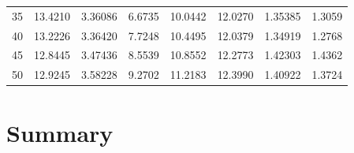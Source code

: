 \documentclass[a4paper,twoside,12pt]{book}
\newcounter{PagesWithoutNumbers}
\begin{document}
\begin{table}
\begin{tabular}{rrrrrrrr}
	      35 & 13.4210 & 3.36086 &       6.6735 &    10.0442 &    12.0270 & 1.35385 &                       1.3059 \\
	      40 & 13.2226 & 3.36420 &       7.7248 &    10.4495 &    12.0379 & 1.34919 &                       1.2768 \\
	      45 & 12.8445 & 3.47436 &       8.5539 &    10.8552 &    12.2773 & 1.42303 &                       1.4362 \\
	      50 & 12.9245 & 3.58228 &       9.2702 &    11.2183 &    12.3990 & 1.40922 &                       1.3724 \\
\bottomrule
\end{tabular}
\end{table}  



\chapter{Summary}




\backmatter
{}
\setcounter{page}{\value{PagesWithoutNumbers}}

\pagestyle{onlyPageNumbers}




\end{document}
